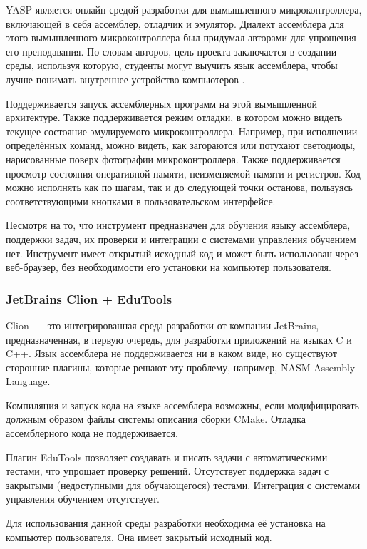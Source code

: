 \documentclass[a4paper,article,14pt]{extarticle}
\begin{document}
YASP\cite{yasp} является онлайн средой разработки для вымышленного микроконтроллера, включающей в себя ассемблер, отладчик и эмулятор. Диалект ассемблера для этого вымышленного микроконтроллера был придумал авторами для упрощения его преподавания. По словам авторов, цель проекта заключается в создании среды, используя которую, студенты могут выучить язык ассемблера, чтобы лучше понимать внутреннее устройство компьютеров \cite{yasp}.

Поддерживается запуск ассемблерных программ на этой вымышленной архитектуре. Также поддерживается режим отладки, в котором можно видеть текущее состояние эмулируемого микроконтроллера. Например, при исполнении определённых команд, можно видеть, как загораются или потухают светодиоды, нарисованные поверх фотографии микроконтроллера. Также поддерживается просмотр состояния оперативной памяти, неизменяемой памяти и регистров. Код можно исполнять как по шагам, так и до следующей точки останова, пользуясь соответствующими кнопками в пользовательском интерфейсе.

Несмотря на то, что инструмент предназначен для обучения языку ассемблера, поддержки задач, их проверки и интеграции с системами управления обучением нет. Инструмент имеет открытый исходный код и может быть использован через веб-браузер, без необходимости его установки на компьютер пользователя.

\subsubsection{JetBrains Clion + EduTools}

Clion\cite{clion}~--- это интегрированная среда разработки от компании JetBrains, предназначенная, в первую очередь, для разработки приложений на языках C и C++. Язык ассемблера не поддерживается ни в каком виде, но существуют сторонние плагины, которые решают эту проблему, например, NASM Assembly Language\cite{nasmplugin}.

Компиляция и запуск кода на языке ассемблера возможны, если модифицировать должным образом файлы системы описания сборки CMake. Отладка ассемблерного кода не поддерживается.

Плагин EduTools\cite{edutools} позволяет создавать и писать задачи с автоматическими тестами, что упрощает проверку решений. Отсутствует поддержка задач с закрытыми (недоступными для обучающегося) тестами. Интеграция с системами управления обучением отсутствует.

Для использования данной среды разработки необходима её установка на компьютер пользователя. Она имеет закрытый исходный код.
\end{document}
